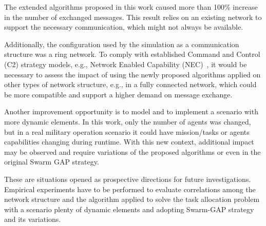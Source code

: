 The extended algorithms proposed in this work caused more than 100\% increase in the number of exchanged messages. This result relies on an existing network to support the necessary communication, which might not always be available. 

Additionally, the configuration used by the simulation as a communication structure was a ring network. To comply with established Command and Control (C2) strategy models, e.g., Network Enabled Capability (NEC)~\citep{CC01}, it would be necessary to assess the impact of using the newly proposed algorithms applied on other types of network structure, e.g., in a fully connected network, which could be more compatible and support a higher demand on message exchange.

Another improvement opportunity is to model and to implement a scenario with more dynamic elements. In this work, only the number of agents was changed, but in a real military operation scenario it could have mission/tasks or agents capabilities changing during runtime. With this new context, additional impact may be observed and require variations of the proposed algorithms or even in the original Swarm GAP strategy.

These are situations opened as prospective directions for future investigations. Empirical experiments have to be performed to evaluate correlations among the network structure and the algorithm applied to solve the task allocation problem with a scenario plenty of dynamic elements and adopting Swarm-GAP strategy and its variations.

